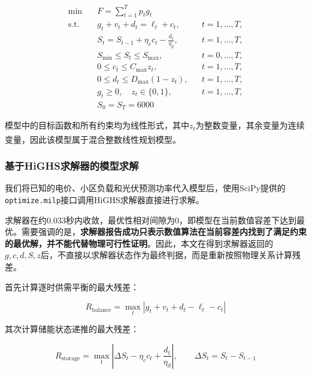 \documentclass[UTF8]{ctexart}
\let\oldcite\cite
\renewcommand{\cite}[1]{\textsuperscript{\oldcite{#1}}}
\begin{document}
    \begin{equation}
        \begin{aligned}
            \min\quad & F=\sum_{t=1}^{T}p_tg_t\\
            \text{s.t.}\quad
            & g_t+v_t+d_t=\ell_t+c_t, && t=1,\ldots,T,\\
            & S_t=S_{t-1}+\eta_cc_t-\frac{d_t}{\eta_d}, && t=1,\ldots,T,\\
            & S_{\min}\leq S_t\leq S_{\max}, && t=0,\ldots,T,\\
            & 0\leq c_t\leq C_{\max}z_t, && t=1,\ldots,T,\\
            & 0\leq d_t\leq D_{\max}(1-z_t), && t=1,\ldots,T,\\
            & g_t\geq0,\quad z_t\in\{0,1\}, && t=1,\ldots,T,\\
            & S_0=S_T=6000
        \end{aligned}
    \end{equation}
    
    模型中的目标函数和所有约束均为线性形式，其中$z_t$为整数变量，其余变量为连续变量，因此该模型属于混合整数线性规划模型\cite{Parisio2014AMP}。
    
    \subsubsection{基于HiGHS求解器的模型求解}
    
    我们将已知的电价、小区负载和光伏预测功率代入模型后，使用SciPy提供的\texttt{optimize.milp}接口调用HiGHS求解器直接进行求解。\par
    
    求解器在约0.033秒内收敛，最优性相对间隙为0，即模型在当前数值容差下达到最优。需要强调的是，\textbf{求解器报告成功只表示数值算法在当前容差内找到了满足约束的最优解，并不能代替物理可行性证明}。因此，本文在得到求解器返回的$g,c,d,S,z$后，不直接以求解器状态作为最终判据，而是重新按照物理关系计算残差。\par
    
    首先计算逐时供需平衡的最大残差：
    
    \begin{equation}
        R_{\mathrm{balance}}
        =\max_t
        \left|
        g_t+v_t+d_t-\ell_t-c_t
        \right|
    \end{equation}
    
    其次计算储能状态递推的最大残差：
    
    \begin{equation}
        R_{\mathrm{storage}}
        =\max_t
        \left|
        \Delta S_t-\eta_cc_t+\frac{d_t}{\eta_d}
        \right|,
        \qquad
        \Delta S_t=S_t-S_{t-1}
    \end{equation}
    
\end{document}
